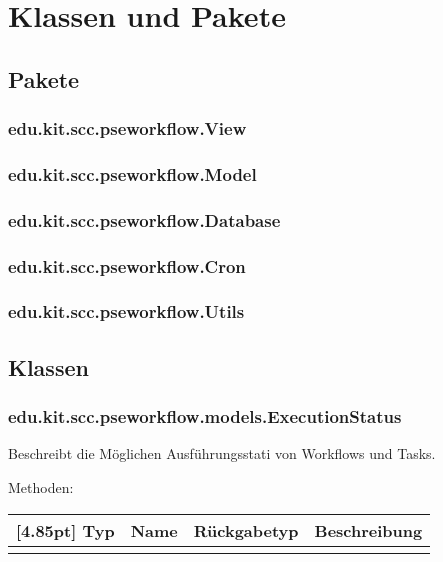\chapter{Klassen und Pakete}

    \section{Pakete}
    
        \subsection{edu.kit.scc.pseworkflow.View}
        \subsection{edu.kit.scc.pseworkflow.Model}
        \subsection{edu.kit.scc.pseworkflow.Database}
        \subsection{edu.kit.scc.pseworkflow.Cron}
        \subsection{edu.kit.scc.pseworkflow.Utils}
        
    \section{Klassen}

		\subsection{edu.kit.scc.pseworkflow.models.ExecutionStatus}	
			Beschreibt die Möglichen Ausführungsstati von Workflows und Tasks.
			
			Methoden:
			\begin{center}
				\setlength\tabcolsep{5pt}
				\renewcommand{\arraystretch}{1.5}
				
				\begin{tabularx}{\textwidth}{|l|l|l|X|}
					\hline
					\rowcolor[gray]{0.75}[4.85pt]
					Typ & Name & Rückgabetyp & Beschreibung \\ \hline
					&&& \\ 
					\hline
				\end{tabularx}
			\end{center}
			
